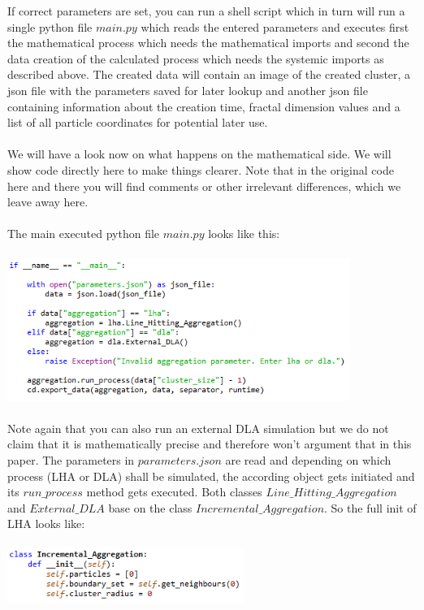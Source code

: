 \documentclass[12pt,a4paper]{scrartcl}
\numberwithin{equation}{subsection}
\newcommand{\1}{\mathbbm{1}}
\numberwithin{equation}{section}
\theoremstyle{definition}
\begin{document}
\noindent If correct parameters are set, you can run a shell script which in turn will run a single python file $\mathit{main.py}$ which reads the entered parameters and executes first the mathematical process which needs the mathematical imports and second the data creation of the calculated process which needs the systemic imports as described above. The created data will contain an image of the created cluster, a json file with the parameters saved for later lookup and another json file containing information about the creation time, fractal dimension values and a list of all particle coordinates for potential later use. \\
\\We will have a look now on what happens on the mathematical side. We will show code directly here to make things clearer. Note that in the original code here and there you will find comments or other irrelevant differences, which we leave away here. \\
\\The main executed python file $\mathit{main.py}$ looks like this:\\
\\
\includegraphics[height=4.66cm]{images/code-snippets/mainpy.png} \\
\\
Note again that you can also run an external DLA simulation but we do not claim that it is mathematically precise and therefore won't argument that in this paper. The parameters in $\mathit{parameters.json}$ are read and depending on which process (LHA or DLA) shall be simulated, the according object gets initiated and its $\mathit{run\_process}$ method gets executed. Both classes $\mathit{Line\_Hitting\_Aggregation}$ and $\mathit{External\_DLA}$ base on the class $\mathit{Incremental\_Aggregation}$. So the full init of LHA looks like: \\
\\
\includegraphics[height=1.8cm]{images/code-snippets/initia.png} \\
\end{document}
